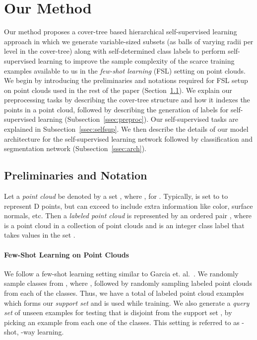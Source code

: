 \documentclass{article}
\begin{document}
\section{Our Method}
\label{ourmethod}
Our method proposes a cover-tree based hierarchical self-supervised learning approach in which we generate variable-sized subsets (as balls of varying radii per level in the cover-tree) along with self-determined class 
labels to perform self-supervised learning to improve the sample complexity of the scarce training examples available to us in the \emph{few-shot learning} (FSL) setting on point clouds. 
We begin by introducing the preliminaries and notations required for FSL setup on point clouds used in the rest of the paper (Section~\ref{subsec:prelim}). 
We explain our preprocessing tasks by describing the cover-tree structure and how it indexes the points in a point cloud, followed by describing the generation of labels for self-supervised learning (Subsection~\ref{ssec:preproc}). Our self-supervised tasks are explained in Subsection~\ref{ssec:selfsup}. We then describe the details of our model architecture for the self-supervised learning network followed by classification and 
segmentation network (Subsection~\ref{ssec:arch}).

\subsection{Preliminaries and Notation}
\label{subsec:prelim}

Let a \emph{point cloud} be denoted by a set , where , for . 
Typically,  is set to  to represent D points, but  can exceed  to include extra information like color, surface normals, etc. Then a \emph{labeled point cloud} is represented by an ordered pair , where 
 is a point cloud in a collection of point clouds  and  is an integer class label that takes values in the set . 
\paragraph{Few-Shot Learning on Point Clouds} 
We follow a few-shot learning setting similar to Garcia et. al.~\cite{garcia2018}. 
We randomly sample  classes from , where , followed by randomly sampling  labeled point clouds from each of the  classes. Thus, we have a total of  labeled point cloud examples which forms our \emph{support set}  and is used while training. We also generate a \emph{query set}  of unseen examples for testing that is disjoint from the support set , by picking an example from each one of the  classes. 
This setting is referred to as -shot, -way learning. 
\end{document}
